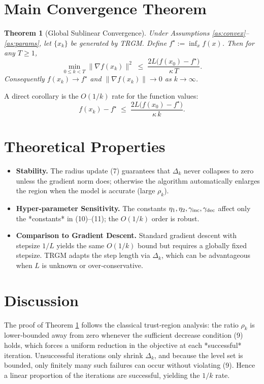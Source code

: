\documentclass{article}
\newtheorem{theorem}{Theorem}
\begin{document}
\section*{Main Convergence Theorem}
\begin{theorem}[Global Sublinear Convergence]\label{thm:main}
Under Assumptions \ref{as:convex}–\ref{as:params}, let $\{x_k\}$ be generated by TRGM.  
Define $f^\star:=\inf_{x}f(x)$. Then for any $T\ge1$,
\[
\min_{0\le k<T}\|\nabla f(x_k)\|^2\;\le\;
\frac{2L\bigl(f(x_0)-f^\star\bigr)}{\kappa\,T}.
\tag{10}
\]
Consequently $f(x_k)\to f^\star$ and $\|\nabla f(x_k)\|\to0$ as $k\to\infty$.
\end{theorem}
A direct corollary is the $O(1/k)$ rate for the function values:
\[
f(x_k)-f^\star\;\le\;\frac{2L\bigl(f(x_0)-f^\star\bigr)}{\kappa\,k}.
\tag{11}
\]

\section*{Theoretical Properties}
\begin{itemize}
\item \textbf{Stability.} The radius update (7) guarantees that $\Delta_k$ never collapses to zero unless the gradient norm does; otherwise the algorithm automatically enlarges the region when the model is accurate (large $\rho_k$).
\item \textbf{Hyper‑parameter Sensitivity.} The constants $\eta_1,\eta_2,\gamma_{\rm inc},\gamma_{\rm dec}$ affect only the *constants* in (10)–(11); the $O(1/k)$ order is robust.
\item \textbf{Comparison to Gradient Descent.} Standard gradient descent with stepsize $1/L$ yields the same $O(1/k)$ bound but requires a globally fixed stepsize. TRGM adapts the step length via $\Delta_k$, which can be advantageous when $L$ is unknown or over‑conservative.
\end{itemize}

\section*{Discussion}
The proof of Theorem \ref{thm:main} follows the classical trust‑region analysis: the ratio $\rho_k$ is lower‑bounded away from zero whenever the sufficient decrease condition (9) holds, which forces a uniform reduction in the objective at each *successful* iteration. Unsuccessful iterations only shrink $\Delta_k$, and because the level set is bounded, only finitely many such failures can occur without violating (9). Hence a linear proportion of the iterations are successful, yielding the $1/k$ rate.
\end{document}
